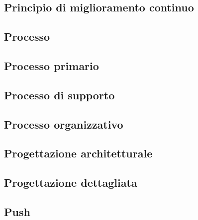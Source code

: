 \subsection{Principio di miglioramento continuo} 

\subsection{Processo} 

\subsection{Processo primario} 

\subsection{Processo di supporto} 

\subsection{Processo organizzativo} 

\subsection{Progettazione architetturale} 

\subsection{Progettazione dettagliata} 

\subsection{Push} 

